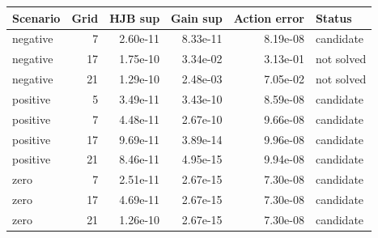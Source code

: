 \begin{tabular}{lrrrrl}
\toprule Scenario & Grid & HJB sup & Gain sup & Action error & Status \\
\midrule
negative & 7 & 2.60e-11 & 8.33e-11 & 8.19e-08 & candidate \\
negative & 17 & 1.75e-10 & 3.34e-02 & 3.13e-01 & not solved \\
negative & 21 & 1.29e-10 & 2.48e-03 & 7.05e-02 & not solved \\
positive & 5 & 3.49e-11 & 3.43e-10 & 8.59e-08 & candidate \\
positive & 7 & 4.48e-11 & 2.67e-10 & 9.66e-08 & candidate \\
positive & 17 & 9.69e-11 & 3.89e-14 & 9.96e-08 & candidate \\
positive & 21 & 8.46e-11 & 4.95e-15 & 9.94e-08 & candidate \\
zero & 7 & 2.51e-11 & 2.67e-15 & 7.30e-08 & candidate \\
zero & 17 & 4.69e-11 & 2.67e-15 & 7.30e-08 & candidate \\
zero & 21 & 1.26e-10 & 2.67e-15 & 7.30e-08 & candidate \\
\bottomrule
\end{tabular}
